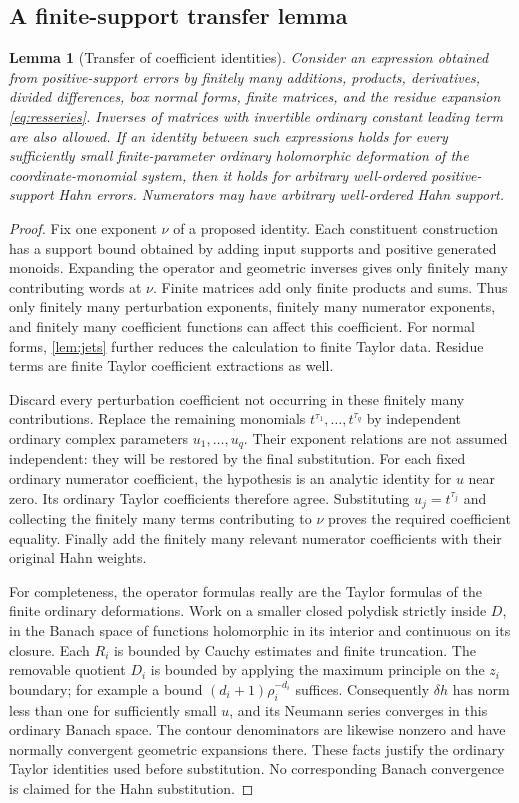 \documentclass[11pt,letterpaper]{article}
\newtheorem{lemma}[theorem]{Lemma}
\theoremstyle{definition}
\theoremstyle{remark}
\numberwithin{equation}{section}
\begin{document}
\subsection{A finite-support transfer lemma}
\begin{lemma}[Transfer of coefficient identities]\label{lem:transfer}
Consider an expression obtained from positive-support errors by finitely many additions, products, derivatives, divided differences, box normal forms, finite matrices, and the residue expansion \eqref{eq:resseries}. Inverses of matrices with invertible ordinary constant leading term are also allowed. If an identity between such expressions holds for every sufficiently small finite-parameter ordinary holomorphic deformation of the coordinate-monomial system, then it holds for arbitrary well-ordered positive-support Hahn errors. Numerators may have arbitrary well-ordered Hahn support.
\end{lemma}
\begin{proof}
Fix one exponent $\nu$ of a proposed identity. Each constituent construction has a support bound obtained by adding input supports and positive generated monoids. Expanding the operator and geometric inverses gives only finitely many contributing words at $\nu$. Finite matrices add only finite products and sums. Thus only finitely many perturbation exponents, finitely many numerator exponents, and finitely many coefficient functions can affect this coefficient. For normal forms, \cref{lem:jets} further reduces the calculation to finite Taylor data. Residue terms are finite Taylor coefficient extractions as well.

Discard every perturbation coefficient not occurring in these finitely many contributions. Replace the remaining monomials $t^{\tau_1},\ldots,t^{\tau_q}$ by independent ordinary complex parameters $u_1,\ldots,u_q$. Their exponent relations are not assumed independent: they will be restored by the final substitution. For each fixed ordinary numerator coefficient, the hypothesis is an analytic identity for $u$ near zero. Its ordinary Taylor coefficients therefore agree. Substituting $u_j=t^{\tau_j}$ and collecting the finitely many terms contributing to $\nu$ proves the required coefficient equality. Finally add the finitely many relevant numerator coefficients with their original Hahn weights.

For completeness, the operator formulas really are the Taylor formulas of the finite ordinary deformations. Work on a smaller closed polydisk strictly inside $D$, in the Banach space of functions holomorphic in its interior and continuous on its closure. Each $R_i$ is bounded by Cauchy estimates and finite truncation. The removable quotient $D_i$ is bounded by applying the maximum principle on the $z_i$ boundary; for example a bound $(d_i+1)\rho_i^{-d_i}$ suffices. Consequently $\delta h$ has norm less than one for sufficiently small $u$, and its Neumann series converges in this ordinary Banach space. The contour denominators are likewise nonzero and have normally convergent geometric expansions there. These facts justify the ordinary Taylor identities used before substitution. No corresponding Banach convergence is claimed for the Hahn substitution.
\end{proof}
\end{document}
